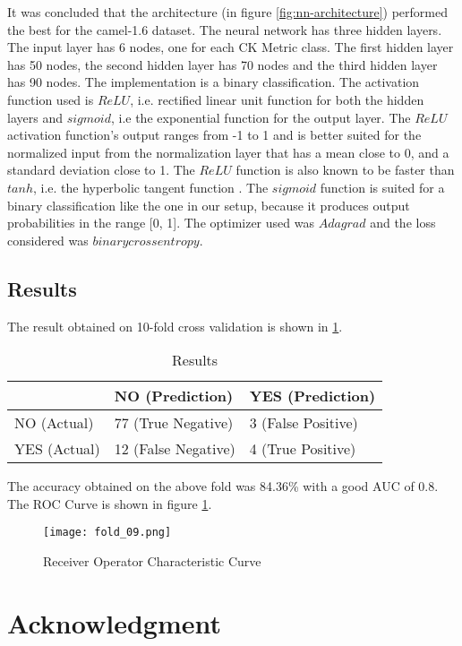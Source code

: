 \documentclass[10pt, conference, compsocconf]{IEEEtran}
\begin{document}
It was concluded that the architecture (in figure \ref{fig:nn-architecture}) performed the best for the camel-1.6 dataset. The neural network has three hidden layers. The input layer has 6 nodes, one for each CK Metric class. The first hidden layer has 50 nodes, the second hidden layer has 70 nodes and the third hidden layer has 90 nodes. The implementation is a binary classification. The activation function used is $ReLU$, i.e. rectified linear unit function for both the hidden layers and $sigmoid$, i.e the exponential function for the output layer. The $ReLU$ activation function's output ranges from -1 to 1 and is better suited for the normalized input from the normalization layer that has a mean close to 0, and a standard deviation close to 1. The $ReLU$ function is also known to be faster than $tanh$, i.e. the hyperbolic tangent function \cite{relufaster}. The $sigmoid$ function is suited for a binary classification like the one in our setup, because it produces output probabilities in the range [0, 1]. The optimizer used was $Adagrad$ and the loss considered was $binary crossentropy$.

\subsection{Results}
The result obtained on 10-fold cross validation is shown in \ref{tab:results}.

\begin{table}[]
  \centering
  \begin{tabular}{l|l|l|}
    \cline{2-3}
    & NO (Prediction)     & YES (Prediction) \\ \hline
    \multicolumn{1}{|l|}{NO (Actual)}  & 77 (True Negative)  & 3 (False Positive)  \\ \hline
    \multicolumn{1}{|l|}{YES (Actual)} & 12 (False Negative) & 4 (True Positive)  \\ \hline
  \end{tabular}
  \caption{Results}
  \label{tab:results}
\end{table}

The accuracy obtained on the above fold was 84.36\% with a good AUC of 0.8. The ROC Curve is shown in figure \ref{fig:roc}.

\begin{figure}[h]
\centering
\texttt{[image: fold\_09.png]}
\caption{Receiver Operator Characteristic Curve}
\label{fig:roc}
\end{figure}

\section*{Acknowledgment}
\end{document}
